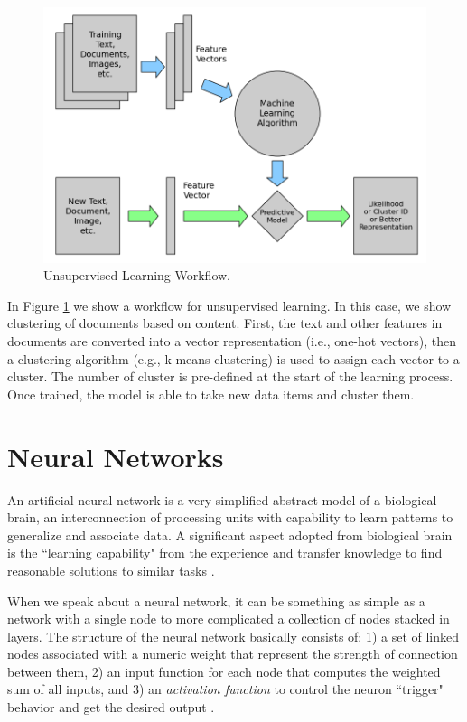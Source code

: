 \documentclass[12pt]{report}
\begin{document}
	\begin{figure}[H]	
		\centering
		\includegraphics[width=150mm, scale = 1]{images/2-Unsupervised_Learning.png}	
		\caption{Unsupervised Learning Workflow.}	
		\label{figure:Unsupervised_Learning}
	\end{figure}
	
	In Figure \ref{figure:Unsupervised_Learning} we show a workflow for unsupervised learning. In this case, we show clustering of documents based on content. First, the text and other features in documents are converted into a vector representation (i.e., one-hot vectors), then a clustering algorithm (e.g., k-means clustering) is used to assign each vector to a cluster. The number of cluster is pre-defined at the start of the learning process.
	Once trained, the model is able to take new data items and cluster them.
	
	\section{Neural Networks}
	An artificial neural network is a very simplified abstract model of a biological brain, an interconnection of processing units with capability to learn patterns to generalize and associate data. A significant aspect adopted from biological brain is the ``learning capability" from the experience and transfer knowledge to find reasonable solutions to similar tasks \cite{ Gurney2004} \cite{ Kriesel2005}.
	
	When we speak about a neural network, it can be something as simple as a network with a single node to more complicated a collection of nodes stacked in layers\cite{ Kriesel2005}. The structure of  the neural network basically consists of:  1) a set of linked nodes  associated with a numeric weight that represent the strength of connection between them, 2) an input function for each node that computes the weighted sum of all inputs, and 3) an {\em activation function} to control the neuron ``trigger" behavior and get the desired output \cite{ Kriesel2005} \cite{Russell2010}. 
	
\end{document}
